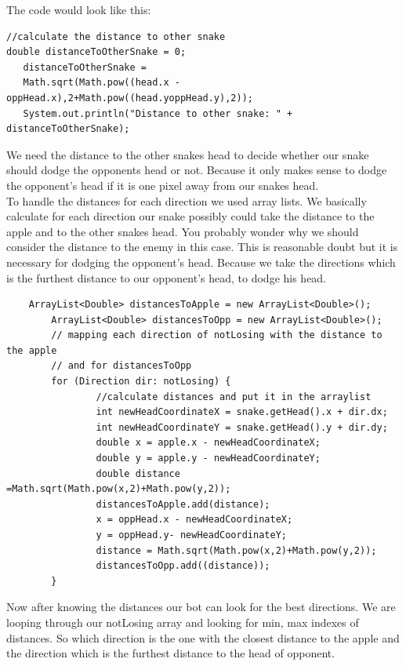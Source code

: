 \documentclass[a4paper,12pt]{article}
\begin{document}
\newpage
The code would look like this:
\begin{verbatim}
//calculate the distance to other snake
double distanceToOtherSnake = 0;
   distanceToOtherSnake =  
   Math.sqrt(Math.pow((head.x - oppHead.x),2+Math.pow((head.yoppHead.y),2));
   System.out.println("Distance to other snake: " + distanceToOtherSnake);
\end{verbatim}
We need the distance to the other snakes head to decide whether our snake should dodge the opponents head or not. Because it only makes sense to dodge the opponent's head if it is one pixel away from our snakes head.\\
To handle the distances for each direction we used array lists. We basically calculate for each direction our snake possibly could take the  distance to the apple and to the other snakes head. You probably wonder why we should consider the distance to the enemy in this case. This is reasonable doubt but it is necessary for dodging the opponent's head. Because we take the directions which is the furthest distance to our opponent's head, to dodge his head.\\
\begin{verbatim}
	ArrayList<Double> distancesToApple = new ArrayList<Double>();
        ArrayList<Double> distancesToOpp = new ArrayList<Double>();
        // mapping each direction of notLosing with the distance to the apple
        // and for distancesToOpp
        for (Direction dir: notLosing) {
                //calculate distances and put it in the arraylist
                int newHeadCoordinateX = snake.getHead().x + dir.dx;
                int newHeadCoordinateY = snake.getHead().y + dir.dy;
                double x = apple.x - newHeadCoordinateX;
                double y = apple.y - newHeadCoordinateY;
                double distance =Math.sqrt(Math.pow(x,2)+Math.pow(y,2));
                distancesToApple.add(distance);
                x = oppHead.x - newHeadCoordinateX;
                y = oppHead.y- newHeadCoordinateY;
                distance = Math.sqrt(Math.pow(x,2)+Math.pow(y,2));
                distancesToOpp.add((distance));
        }
\end{verbatim}
Now after knowing the distances our bot can look for the best directions. We are looping through our notLosing array and looking for min, max indexes of distances. So which direction is the one with the closest distance to the apple and the direction which is the furthest distance to the head of opponent.
\newpage
\end{document}
